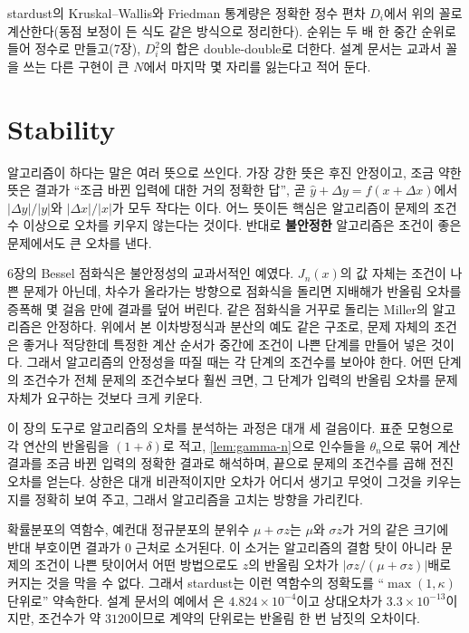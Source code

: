 \begin{instardust}
stardust의 Kruskal--Wallis와 Friedman 통계량은 정확한 정수 편차 $D_i$에서 위의 꼴로 계산한다(동점 보정이 든 식도 같은 방식으로 정리한다). 순위는 두 배 한 중간 순위로 들어 정수로 만들고(7장), $D_i^2$의 합은 double-double로 더한다. 설계 문서는 교과서 꼴을 쓰는 다른 구현이 큰 $N$에서 마지막 몇 자리를 잃는다고 적어 둔다.
\end{instardust}

\section{Stability}
\label{sec:stability}

알고리즘이 하다는 말은 여러 뜻으로 쓰인다. 가장 강한 뜻은 후진 안정이고, 조금 약한 뜻은 결과가 ``조금 바뀐 입력에 대한 거의 정확한 답'', 곧 $\hat y+\Delta y=f(x+\Delta x)$에서 $|\Delta y|/|y|$와 $|\Delta x|/|x|$가 모두 작다는 이다. 어느 뜻이든 핵심은 알고리즘이 문제의 조건수 이상으로 오차를 키우지 않는다는 것이다. 반대로 \textbf{불안정한} 알고리즘은 조건이 좋은 문제에서도 큰 오차를 낸다.

6장의 Bessel 점화식은 불안정성의 교과서적인 예였다. $J_n(x)$의 값 자체는 조건이 나쁜 문제가 아닌데, 차수가 올라가는 방향으로 점화식을 돌리면 지배해가 반올림 오차를 증폭해 몇 걸음 만에 결과를 덮어 버린다. 같은 점화식을 거꾸로 돌리는 Miller의 알고리즘은 안정하다. 위에서 본 이차방정식과 분산의 예도 같은 구조로, 문제 자체의 조건은 좋거나 적당한데 특정한 계산 순서가 중간에 조건이 나쁜 단계를 만들어 넣은 것이다. 그래서 알고리즘의 안정성을 따질 때는 각 단계의 조건수를 보아야 한다. 어떤 단계의 조건수가 전체 문제의 조건수보다 훨씬 크면, 그 단계가 입력의 반올림 오차를 문제 자체가 요구하는 것보다 크게 키운다.

이 장의 도구로 알고리즘의 오차를 분석하는 과정은 대개 세 걸음이다. 표준 모형으로 각 연산의 반올림을 $(1+\delta)$로 적고, \cref{lem:gamma-n}으로 인수들을 $\theta_n$으로 묶어 계산 결과를 조금 바뀐 입력의 정확한 결과로 해석하며, 끝으로 문제의 조건수를 곱해 전진 오차를 얻는다. 상한은 대개 비관적이지만 오차가 어디서 생기고 무엇이 그것을 키우는지를 정확히 보여 주고, 그래서 알고리즘을 고치는 방향을 가리킨다.

\begin{instardust}
확률분포의 역함수, 예컨대 정규분포의 분위수 $\mu+\sigma z$는 $\mu$와 $\sigma z$가 거의 같은 크기에 반대 부호이면 결과가 $0$ 근처로 소거된다. 이 소거는 알고리즘의 결함 탓이 아니라 문제의 조건이 나쁜 탓이어서 어떤 방법으로도 $z$의 반올림 오차가 $|\sigma z/(\mu+\sigma z)|$배로 커지는 것을 막을 수 없다. 그래서 stardust는 이런 역함수의 정확도를 ``$\max(1,\kappa)$ 단위로'' 약속한다. 설계 문서의 예에서 은 $4.824\times10^{-4}$이고 상대오차가 $3.3\times10^{-13}$이지만, 조건수가 약 $3120$이므로 계약의 단위로는 반올림 한 번 남짓의 오차이다.
\end{instardust}

